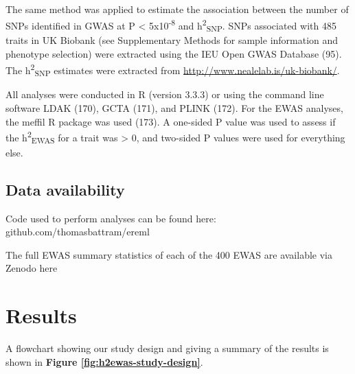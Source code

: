 \documentclass[11pt,oneside]{bristolthesis}
\begin{document}
The same method was applied to estimate the association between the number of SNPs identified in GWAS at P \textless{} 5x10\textsuperscript{-8} and h\textsuperscript{2}\textsubscript{SNP}. SNPs associated with 485 traits in UK Biobank (see Supplementary Methods for sample information and phenotype selection) were extracted using the IEU Open GWAS Database (95). The h\textsuperscript{2}\textsubscript{SNP} estimates were extracted from \url{http://www.nealelab.is/uk-biobank/}.

All analyses were conducted in R (version 3.3.3) or using the command line software LDAK (170), GCTA (171), and PLINK (172). For the EWAS analyses, the meffil R package was used (173). A one-sided P value was used to assess if the h\textsuperscript{2}\textsubscript{EWAS} for a trait was \textgreater{} 0, and two-sided P values were used for everything else.

\hypertarget{data-availability-05}{%
\subsection{Data availability}\label{data-availability-05}}

Code used to perform analyses can be found here: github.com/thomasbattram/ereml

The full EWAS summary statistics of each of the 400 EWAS are available via Zenodo here

\hypertarget{results-05}{%
\section{Results}\label{results-05}}

A flowchart showing our study design and giving a summary of the results is shown in \textbf{Figure \ref{fig:h2ewas-study-design}}.
\end{document}
